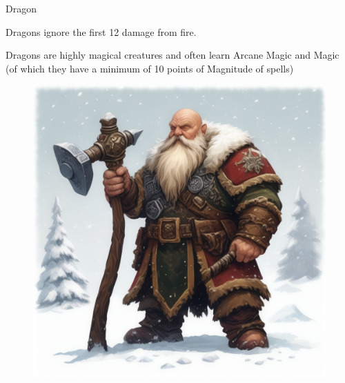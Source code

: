 \begin{monsterbox}{Dragon}
\begin{rpg-monsteraction}
	\end{rpg-monsteraction}
	\begin{rpg-monsteraction}
		Dragons ignore the first 12 damage from fire.
	\end{rpg-monsteraction}
	\begin{rpg-monsteraction}[Supernatural]
		Dragons are highly magical creatures and often learn Arcane Magic and Magic (of which they have a minimum of 10 points of Magnitude of spells)
	\end{rpg-monsteraction}
\end{monsterbox}



\begin{figure}[h]
\begin{center}
\includegraphics[scale=0.24]{img/ai-images/dwarf.png}
\end{center}
\end{figure}
\label{creature:dwarf}
